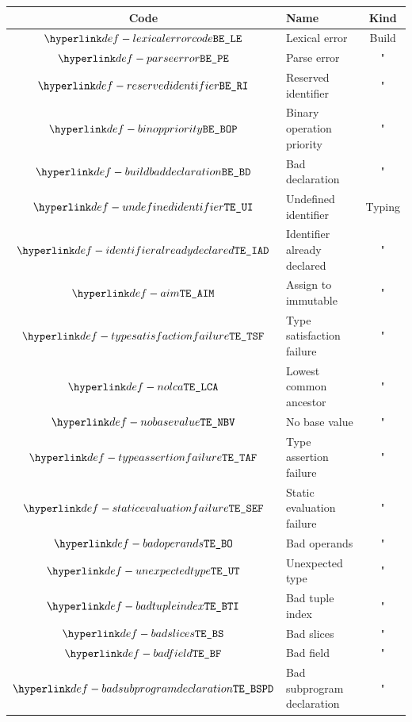 \begin{center}
\begin{tabular}{clc}
\hline
\textbf{Code} & \textbf{Name} & \textbf{Kind} \\
\hline
  $\LexicalError$                & Lexical error                  & Build         \\
  $\ParseError$                  & Parse error                    & "             \\
  $\ReservedIdentifier$          & Reserved identifier            & "             \\
  $\BinopPriority$               & Binary operation priority    & "             \\
  $\BuildBadDeclaration$         & Bad declaration                & "             \\
  \hline
  $\UndefinedIdentifier$         & Undefined identifier           & Typing        \\
  $\IdentifierAlreadyDeclared$   & Identifier already declared    & "             \\
  $\AssignmentToImmutable$       & Assign to immutable            & "             \\
  $\TypeSatisfactionFailure$     & Type satisfaction failure      & "             \\
  $\NoLCA$                       & Lowest common ancestor         & "             \\
  $\NoBaseValue$                 & No base value                  & "             \\
  $\TypeAssertionFailure$        & Type assertion failure         & "             \\
  $\StaticEvaluationFailure$     & Static evaluation failure      & "             \\
  $\BadOperands$                 & Bad operands                   & "             \\
  $\UnexpectedType$              & Unexpected type                & "             \\
  $\BadTupleIndex$               & Bad tuple index                & "             \\
  $\BadSlices$                   & Bad slices                     & "             \\
  $\BadField$                    & Bad field                      & "             \\
  $\BadSubprogramDeclaration$    & Bad subprogram declaration     & "             \\

\end{tabular}
\end{center}
